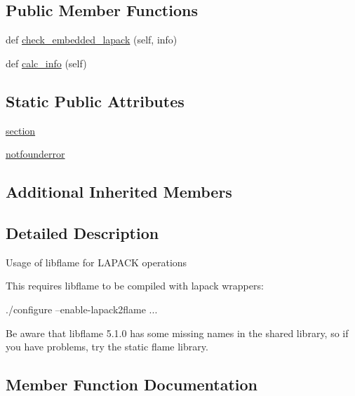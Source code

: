 \subsection*{Public Member Functions}
\begin{DoxyCompactItemize}
\item 
def \hyperlink{classnumpy_1_1distutils_1_1system__info_1_1flame__info_addab4399b13450aaf29d4b94b7a1deae}{check\+\_\+embedded\+\_\+lapack} (self, info)
\item 
def \hyperlink{classnumpy_1_1distutils_1_1system__info_1_1flame__info_a367b4e8789d9693e27484d68e990a906}{calc\+\_\+info} (self)
\end{DoxyCompactItemize}
\subsection*{Static Public Attributes}
\begin{DoxyCompactItemize}
\item 
\hyperlink{classnumpy_1_1distutils_1_1system__info_1_1flame__info_a5457945c4b97dffad697f3548e6d3017}{section}
\item 
\hyperlink{classnumpy_1_1distutils_1_1system__info_1_1flame__info_affbc691973068c101277884bc49a9a6e}{notfounderror}
\end{DoxyCompactItemize}
\subsection*{Additional Inherited Members}


\subsection{Detailed Description}
\begin{DoxyVerb}Usage of libflame for LAPACK operations

This requires libflame to be compiled with lapack wrappers:

./configure --enable-lapack2flame ...

Be aware that libflame 5.1.0 has some missing names in the shared library, so
if you have problems, try the static flame library.
\end{DoxyVerb}
 

\subsection{Member Function Documentation}
\mbox{\label{classnumpy_1_1distutils_1_1system__info_1_1flame__info_a367b4e8789d9693e27484d68e990a906}} 
